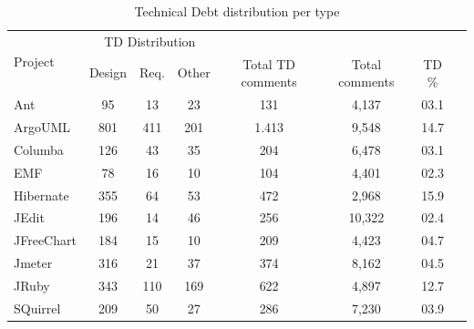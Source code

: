 \begin{table}
    \begin{center}
        \caption{Technical Debt distribution per type}
        \label{tbl:td_distribution}
        \begin{tabular}{l|ccccccc}
        \toprule
        \multirow{2}{*}{Project} & \multicolumn{3}{c}{TD Distribution} \\ & {Design} & {Req.}  & {Other} & \multirow{-2}{*}{Total TD comments} & \multirow{-2}{*}{Total comments} &  \multirow{-2}{*}{TD \%} \\
        \midrule
        Ant            &  95 &  13  &  23 &   131 &   4,137  & 03.1 \\
        ArgoUML        &  801 & 411 & 201 & 1.413 &   9,548  & 14.7 \\
        Columba        &  126 &  43 &  35 &   204 &   6,478  & 03.1 \\
        EMF            &  78 &  16  &  10 &   104 &   4,401  & 02.3 \\
        Hibernate      &  355 &  64 &  53 &   472 &   2,968  & 15.9 \\
        JEdit          &  196 &  14 &  46 &   256 &  10,322  & 02.4 \\
        JFreeChart     &  184 &  15 &  10 &   209 &   4,423  & 04.7 \\
        Jmeter         &  316 &  21 &  37 &   374 &   8,162  & 04.5 \\
        JRuby          &  343 & 110 & 169 &   622 &   4,897  & 12.7 \\
        SQuirrel       &  209 & 50  & 27  &   286 &   7,230  & 03.9 \\
        \bottomrule
        \end{tabular}
    \end{center}    
\end{table}

\clearpage

